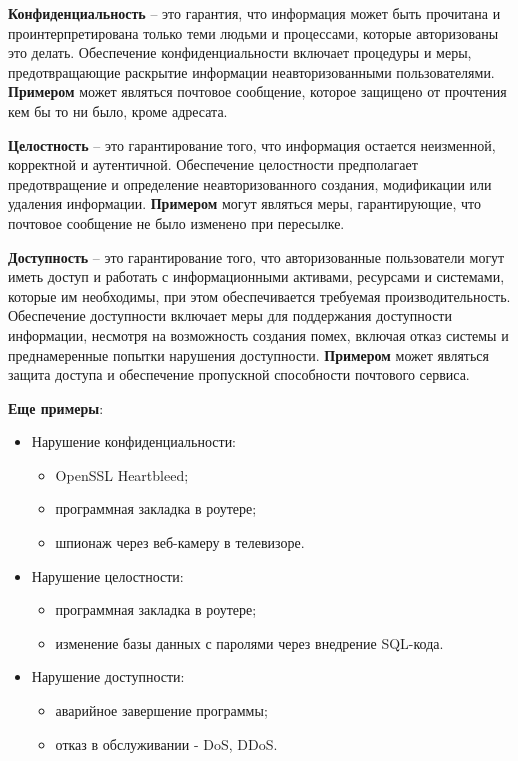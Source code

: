 
\textbf{Конфиденциальность} – это гарантия, что информация может быть прочитана и проинтерпретирована только теми людьми и процессами, которые авторизованы это делать. Обеспечение конфиденциальности включает процедуры и меры, предотвращающие раскрытие информации неавторизованными пользователями. \textbf{Примером} может являться почтовое сообщение, которое защищено от прочтения кем бы то ни было, кроме адресата.

\textbf{Целостность} – это гарантирование того, что информация остается неизменной, корректной и аутентичной. Обеспечение целостности предполагает предотвращение и определение неавторизованного создания, модификации или удаления информации. \textbf{Примером} могут являться меры, гарантирующие, что почтовое сообщение не было изменено при пересылке.

\textbf{Доступность} – это гарантирование того, что авторизованные пользователи могут иметь доступ и работать с информационными активами, ресурсами и системами, которые им необходимы, при этом обеспечивается требуемая производительность. Обеспечение доступности включает меры для поддержания доступности информации, несмотря на возможность создания помех, включая отказ системы и преднамеренные попытки нарушения доступности. \textbf{Примером} может являться защита доступа и обеспечение пропускной способности почтового сервиса.

\textbf{Еще примеры}:
\begin{itemize}
    \item Нарушение конфиденциальности:
        \begin{itemize}
            \item OpenSSL Heartbleed;
            \item программная закладка в роутере;
            \item шпионаж через веб-камеру в телевизоре.
        \end{itemize}
    \item Нарушение целостности:
        \begin{itemize}
            \item программная закладка в роутере;
            \item изменение базы данных с паролями через внедрение
SQL-кода.
        \end{itemize}
    \item Нарушение доступности:
    \begin{itemize}
        \item аварийное завершение программы;
        \item отказ в обслуживании - DoS, DDoS.
    \end{itemize}
\end{itemize}

